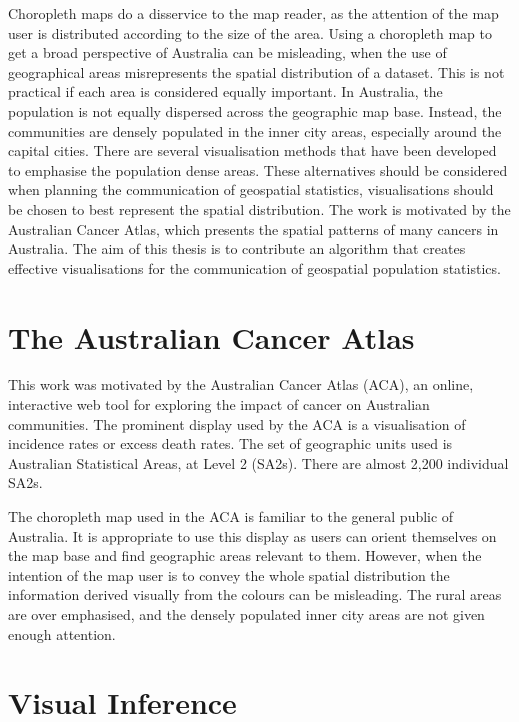 \documentclass{monashthesis}
\begin{document}
Choropleth maps do a disservice to the map reader, as the attention of the map user is distributed according to the size of the area. Using a choropleth map to get a broad perspective of Australia can be misleading, when the use of geographical areas misrepresents the spatial distribution of a dataset. This is not practical if each area is considered equally important. In Australia, the population is not equally dispersed across the geographic map base.
Instead, the communities are densely populated in the inner city areas, especially around the capital cities. There are several visualisation methods that have been developed to emphasise the population dense areas. These alternatives should be considered when planning the communication of geospatial statistics, visualisations should be chosen to best represent the spatial distribution. The work is motivated by the Australian Cancer Atlas,
which presents the spatial patterns of many cancers in Australia. The aim of this thesis is to contribute an algorithm that creates effective visualisations for the communication of geospatial population statistics.

\hypertarget{the-australian-cancer-atlas}{%
\section{The Australian Cancer Atlas}\label{the-australian-cancer-atlas}}

This work was motivated by the Australian Cancer Atlas (ACA), an online, interactive web tool for exploring the impact of cancer on Australian communities. The prominent display used by the ACA is a visualisation of incidence rates or excess death rates. The set of geographic units used is Australian Statistical Areas, at Level 2 (SA2s). There are almost 2,200 individual SA2s.

The choropleth map used in the ACA is familiar to the general public of Australia. It is appropriate to use this display as users can orient themselves on the map base and find geographic areas relevant to them.
However, when the intention of the map user is to convey the whole spatial distribution the information derived visually from the colours can be misleading.
The rural areas are over emphasised, and the densely populated inner city areas are not given enough attention.

\hypertarget{visual-inference}{%
\section{Visual Inference}\label{visual-inference}}
\end{document}
